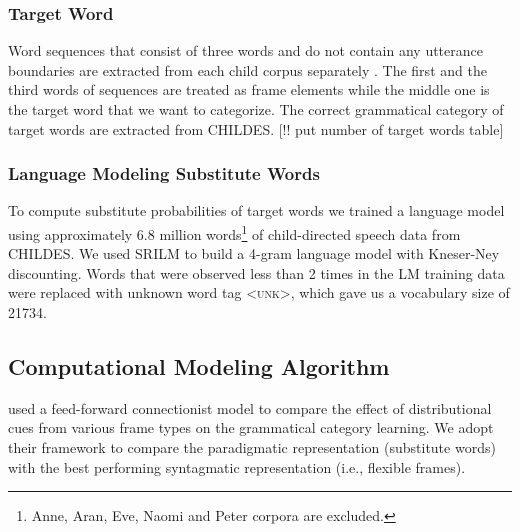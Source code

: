 \subsubsection{Target Word}
Word sequences that consist of three words and do not contain any utterance
boundaries are extracted from each child corpus separately
\citep*{Mintz200391}.  The first and the third words of sequences are treated
as frame elements while the middle one is the target word that we want to
categorize.  The correct grammatical category of target words are extracted
from CHILDES.  [!! put number of target words table] 

\subsubsection{Language Modeling Substitute Words}
\label{s:lm}
To compute substitute probabilities of target words we trained a language model
using approximately 6.8 million words\footnote{Anne, Aran, Eve, Naomi and Peter
corpora are excluded.} of child-directed speech data from CHILDES.  We used
SRILM \citep*{Stolcke2002} to build a 4-gram language model with Kneser-Ney
discounting.  Words that were observed less than 2 times in the LM training
data were replaced with unknown word tag \textsc{<unk>}, which gave us a
vocabulary size of 21734.



\subsection{Computational Modeling Algorithm}
\label{s:computational}
\cite{clair2010} used a feed-forward connectionist model to compare
the effect of distributional cues from various frame types on the
grammatical category learning.  We adopt their framework to compare the
paradigmatic representation (substitute words) with the best performing
syntagmatic representation (i.e., flexible frames).

